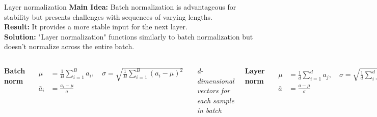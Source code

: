 \documentclass[serif, aspectratio=169]{beamer}
\begin{document}
\begin{frame}{Layer normalization}
    \textbf{Main Idea:} Batch normalization is advantageous for stability but presents challenges with sequences of varying lengths. \\
    \textbf{Result:} It provides a more stable input for the next layer. \\
    \textbf{Solution:} "Layer normalization" functions similarly to batch normalization but doesn't normalize across the entire batch.
    
    \vspace{0.5cm}
    
    \begin{columns}
        \centering
        \textbf{\Large Batch norm}
        
        \begin{align*}
            \mu &= \frac{1}{B} \sum_{i=1}^{B} a_i, \quad \sigma = \sqrt{\frac{1}{B} \sum_{i=1}^{B} (a_i - \mu)^2} \\
            \bar{a}_i &= \frac{a_i - \mu}{\sigma}
        \end{align*}
        
        \textit{d-dimensional vectors for each sample in batch}

        \centering
        \textbf{\Large Layer norm}
        
        \begin{align*}
            \mu &= \frac{1}{d} \sum_{i=1}^{d} a_j, \quad \sigma = \sqrt{\frac{1}{d} \sum_{i=1}^{d} (a_j - \mu)^2} \\
            \bar{a} &= \frac{a - \mu}{\sigma}
        \end{align*}
        
        \textit{Different dimensions of a}
    \end{columns}
    
\end{frame}
\end{document}
